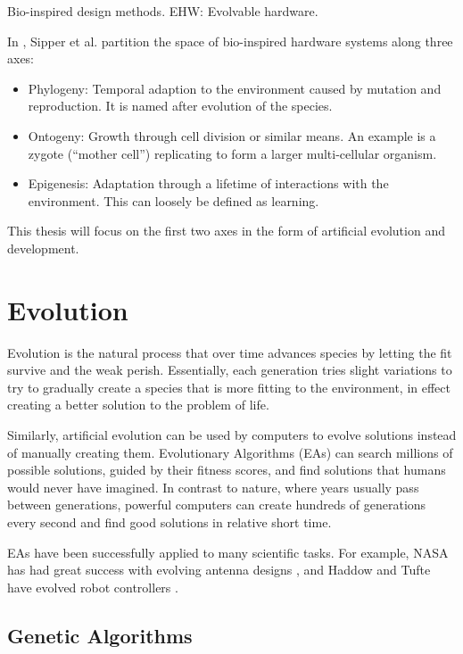 \TODO
Bio-inspired design methods.
EHW: Evolvable hardware.

In \cite{sipper1997poe}, Sipper et al. partition the space of bio-inspired hardware systems along three axes:

\begin{itemize}
    \item
    Phylogeny:
    Temporal adaption to the environment caused by mutation and reproduction.
    It is named after evolution of the species.
    \item
    Ontogeny:
    Growth through cell division or similar means.
    An example is a zygote (``mother cell'') replicating to form a larger multi-cellular organism.
    \item
    Epigenesis:
    Adaptation through a lifetime of interactions with the environment.
    This can loosely be defined as learning.
\end{itemize}

This thesis will focus on the first two axes in the form of artificial evolution and development.


\section{Evolution}

Evolution is the natural process that over time advances species by letting the fit survive and the weak perish.
Essentially, each generation tries slight variations to try to gradually create a species that is more fitting to the environment, in effect creating a better solution to the problem of life.

Similarly, artificial evolution can be used by computers to evolve solutions instead of manually creating them.
Evolutionary Algorithms (EAs) can search millions of possible solutions, guided by their fitness scores, and find solutions that humans would never have imagined.
In contrast to nature, where years usually pass between generations, powerful computers can create hundreds of generations every second and find good solutions in relative short time.

EAs have been successfully applied to many scientific tasks.
For example, NASA has had great success with evolving antenna designs \cite{hornby2006antenna}, and Haddow and Tufte have evolved robot controllers \cite{haddow1999robot}.

\subsection{Genetic Algorithms}

